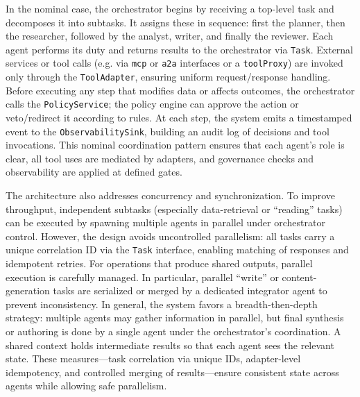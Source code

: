 In the nominal case, the orchestrator begins by receiving a top-level task and decomposes it into subtasks. It assigns these in sequence: first the planner, then the researcher, followed by the analyst, writer, and finally the reviewer. Each agent performs its duty and returns results to the orchestrator via \texttt{Task}. External services or tool calls (e.g. via \texttt{mcp} or \texttt{a2a} interfaces or a \texttt{toolProxy}) are invoked only through the \texttt{ToolAdapter}, ensuring uniform request/response handling. Before executing any step that modifies data or affects outcomes, the orchestrator calls the \texttt{PolicyService}; the policy engine can approve the action or veto/redirect it according to rules. At each step, the system emits a timestamped event to the \texttt{ObservabilitySink}, building an audit log of decisions and tool invocations. This nominal coordination pattern ensures that each agent's role is clear, all tool uses are mediated by adapters, and governance checks and observability are applied at defined gates.

The architecture also addresses concurrency and synchronization. To improve throughput, independent subtasks (especially data-retrieval or “reading” tasks) can be executed by spawning multiple agents in parallel under orchestrator control. However, the design avoids uncontrolled parallelism: all tasks carry a unique correlation ID via the \texttt{Task} interface, enabling matching of responses and idempotent retries. For operations that produce shared outputs, parallel execution is carefully managed. In particular, parallel “write” or content-generation tasks are serialized or merged by a dedicated integrator agent to prevent inconsistency. In general, the system favors a breadth-then-depth strategy: multiple agents may gather information in parallel, but final synthesis or authoring is done by a single agent under the orchestrator's coordination. A shared context holds intermediate results so that each agent sees the relevant state. These measures---task correlation via unique IDs, adapter-level idempotency, and controlled merging of results---ensure consistent state across agents while allowing safe parallelism.

